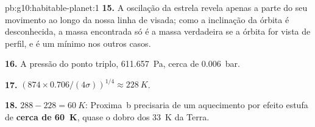 \begin{solution}{pb:g10:habitable-planet:1}
\textbf{15.} A oscilação da estrela revela apenas a parte do seu movimento
ao longo da nossa linha de visada; como a inclinação da órbita é
desconhecida, a massa encontrada só é a massa verdadeira se a órbita for
vista de perfil, e é um mínimo nos outros casos.

\textbf{16.} A pressão do ponto triplo, \qty{611.657}{Pa}, cerca de
\qty{0.006}{bar}.

\textbf{17.} $(874 \times 0.706/(4\sigma))^{1/4} \approx \qty{228}{K}$.

\textbf{18.} $288 - 228 = \qty{60}{K}$: Proxima~b precisaria de um
aquecimento por efeito estufa de \textbf{cerca de \qty{60}{K}}, quase o
dobro dos \qty{33}{K} da Terra.
\end{solution}
